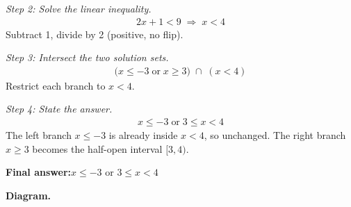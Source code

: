 \documentclass[11pt]{article}
\begin{document}
\textit{Step 2: Solve the linear inequality.}
\[\begin{gathered}
2x + 1 < 9 \;\Longrightarrow\; x < 4
\end{gathered}\]
Subtract 1, divide by 2 (positive, no flip).

\textit{Step 3: Intersect the two solution sets.}
\[\begin{gathered}
\bigl(x \leq -3 \;\text{or}\; x \geq 3\bigr) \;\cap\; (x < 4)
\end{gathered}\]
Restrict each branch to \( x < 4 \).

\textit{Step 4: State the answer.}
\[\begin{gathered}
x \leq -3 \;\text{or}\; 3 \leq x < 4
\end{gathered}\]
The left branch \( x \leq -3 \) is already inside \( x < 4 \), so unchanged. The right branch \( x \geq 3 \) becomes the half-open interval \( [3, 4) \).

\begin{answerbox}
\textbf{Final answer:}\quad \(\displaystyle x \leq -3\) or \(\displaystyle 3 \leq x < 4\)
\end{answerbox}
\textbf{Diagram.}
\end{document}
